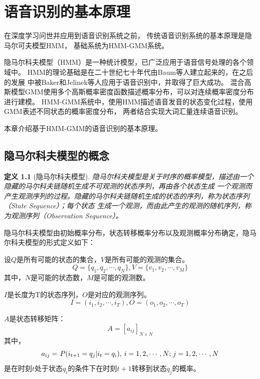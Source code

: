 ﻿%

\chapter{语音识别的基本原理}\label{intro_hmm}

在深度学习问世并应用到语音识别系统之前，
传统语音识别系统的基本原理是隐马尔可夫模型HMM，
基础系统为HMM-GMM系统。

隐马尔科夫模型（HMM）是一种统计模型，已广泛应用于语音信号处理的各个领域中。
HMM的理论基础是在二十世纪七十年代由Baum等人建立起来的，在之后的发展
中被Baker和Jelinek等人应用于语音识别中，并取得了巨大成功。
混合高斯模型GMM使用多个高斯概率密度函数描述概率分布，可以对连续概率密度分布进行建模。
HMM-GMM系统中，使用HMM描述语音发音的状态变化过程，使用GMM表述不同状态的概率密度分布，
两者结合实现大词汇量连续语音识别。


本章介绍基于HMM-GMM的语音识别的基本原理。

\newtheorem{definition}{\hspace{2em}\textbf{定义}}[section]
%
\section{隐马尔科夫模型的概念}

    \begin{definition}[隐马尔科夫模型]
    隐马尔科夫模型是关于时序的概率模型，描述由一个隐藏的马尔科夫链随机生成不可观测的状态序列，再由各个状态生成
    一个观测而产生观测序列的过程。隐藏的马尔科夫链随机生成的状态的序列，称为状态序列（State Sequence）；每个状态
    生成一个观测，而由此产生的观测的随机序列，称为观测序列（Observation Sequence）。
    \end{definition}


    隐马尔科夫模型由初始概率分布，状态转移概率分布以及观测概率分布确定，隐马尔科夫模型的形式定义如下：

    设$Q$是所有可能的状态的集合，$V$是所有可能的观测的集合。
    \[Q = \{ {q_1},{q_2},\cdots,{q_N}\} , V = \{ {v_1},{v_2},\cdots,{v_M}\} \]
    其中，$N$是可能的状态数，$M$是可能的观测数。

    $I$是长度为T的状态序列，$O$是对应的观测序列。
    \[I = ({i_1},{i_2},\cdots,{i_T}), O = ({o_1},{o_2},\cdots,{o_T})\]

    $A$是状态转移矩阵：
    \begin{equation}
    A = {\left[ {{a_{ij}}} \right]_{N \times N}}
    \end{equation}
    其中，
    \begin{equation}
    {a_{ij}} = {\kern 1pt} P({i_{t + 1}} = {q_j}|{i_t} = {q_i}),{\kern 1pt} {\kern 1pt} i = 1,2, \cdots ,N;{\kern 1pt} j = 1,2, \cdots ,N
    \end{equation}
    是在时刻$t$处于状态$q_i$的条件下在时刻$t+1$转移到状态$q_j$的概率。

